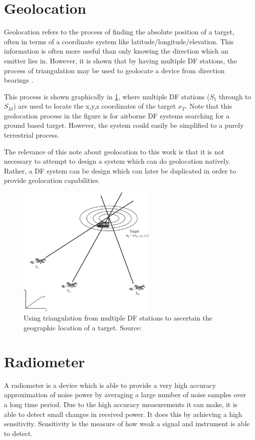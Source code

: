 \section{Geolocation}
Geolocation refers to the process of finding the absolute position of a target, often in terms of a coordinate system like latitude/longitude/elevation. This information is often more useful than only knowing the direction which an emitter lies in. However, it is shown that by having multiple DF stations, the process of triangulation may be used to geolocate a device from direction bearings \cite{poisel2012electronic}. 

This process is shown graphically in \cref{fig:lit-triangulation-from-df}, where multiple DF stations ($S_{1}$ through to $S_{M}$) are used to locate the x,y,z coordinates of the target $x_{T}$. Note that this geolocation process in the figure is for airborne DF systems searching for a ground based target. However, the system could easily be simplified to a purely terrestrial process.

The relevance of this note about geolocation to this work is that it is not necessary to attempt to design a system which can do geolocation natively. Rather, a DF system can be design which can later be duplicated in order to provide geolocation capabilities. 

\begin{figure}[p] 
  \centering
  \includegraphics[width=0.6\textwidth]{./img/lit_review/triangulation_from_df.pdf}
  \caption{Using triangulation from multiple DF stations to ascertain the geographic location of a target. Source: \cite{poisel2012electronic}}
  \label{fig:lit-triangulation-from-df}
\end{figure}

\section{Radiometer}
A radiometer is a device which is able to provide a very high accuracy approximation of noise power by averaging a large number of noise samples over a long time period. Due to the high accuracy measurements it can make, it is able to detect small changes in received power. 
It does this by achieving a high sensitivity. Sensitivity is the measure of how weak a signal and instrument is able to detect.

